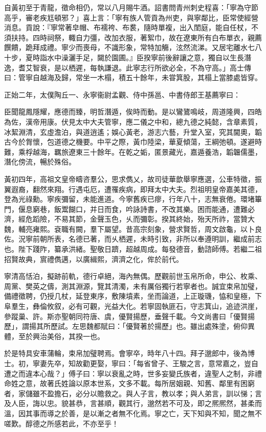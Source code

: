 \begin{pinyinscope}
自黃初至于青龍，徵命相仍，常以八月賜牛酒。詔書問青州刺史程喜：「寧為守節高乎，審老疾尪頓邪？」喜上言：「寧有族人管貢為州吏，與寧鄰比，臣常使經營消息。貢說：『寧常著皁帽、布襦袴、布裠，隨時單複，出入閨庭，能自任杖，不須扶持。四時祠祭，輙自力彊，改加衣服，著絮巾，故在遼東所有白布單衣，親薦饌饋，跪拜成禮。寧少而喪母，不識形象，常特加觴，泫然流涕。又居宅離水七八十步，夏時詣水中澡灑手足，闚於園圃。』臣揆寧前後辭讓之意，獨自以生長潛逸，耆艾智衰，是以栖遲，每執謙退。此寧志行所欲必全，不為守高。」高士傳曰：管寧自越海及歸，常坐一木榻，積五十餘年，未甞箕股，其榻上當膝處皆穿。

正始二年，太僕陶丘一、永寧衞尉孟觀、侍中孫邕、中書侍郎王基薦寧曰：

臣聞龍鳳隱耀，應德而臻，明哲潛遁，俟時而動。是以鸞鷟鳴岐，周道隆興，四皓為佐，漢帝用康。伏見太中大夫管寧，應二儀之中和，總九德之純懿，含章素質，冰絜淵清，玄虛澹泊，與道逍遙；娛心黃老，游志六藝，升堂入室，究其閫奧，韜古今於胷懷，包道德之機要。中平之際，黃巾陸梁，華夏傾蕩，王綱弛頓。遂避時難，乘桴越海，羈旅遼東三十餘年。在乾之姤，匿景藏光，嘉遁養浩，韜韞儒墨，潛化傍流，暢於殊俗。

黃初四年，高祖文皇帝疇咨羣公，思求儁乂，故司徒華歆舉寧應選，公車特徵，振翼遐裔，翻然來翔。行遇屯厄，遭罹疾病，即拜太中大夫。烈祖明皇帝嘉美其德，登為光祿勳。寧疾彌留，未能進道。今寧舊疾已瘳，行年八十，志無衰倦。環堵篳門，偃息窮巷，飯鬻餬口，并日而食，吟詠詩書，不改其樂。困而能通，遭難必濟，經危蹈險，不易其節，金聲玉色，乆而彌彰。揆其終始，殆天所祚，當贊大魏，輔亮雍熙。袞職有闕，羣下屬望。昔高宗刻象，營求賢哲，周文啟龜，以卜良佐。況寧前朝所表，名德已著，而乆栖遲，未時引致，非所以奉遵明訓，繼成前志也。陛下踐阼，纂承洪緒。聖敬日躋，超越周成。每發德音，動諮師傅。若繼二祖招賢故典，賔禮儁邁，以廣緝熙，濟濟之化，侔於前代。

寧清高恬泊，擬跡前軌，德行卓絕，海內無偶。歷觀前世玉帛所命，申公、枚乘、周黨、樊英之儔，測其淵源，覽其清濁，未有厲俗獨行若寧者也。誠宜束帛加璧，備禮徵聘，仍授几杖，延登東序，敷陳墳素，坐而論道，上正璇璣，恊和皇極，下阜羣生，彝倫攸叙，必有可觀，光益大化。若寧固執匪石，守志箕山，追迹洪崖，參蹤巢、許。斯亦聖朝同符唐、虞，優賢揚歷，垂聲千載。今文尚書曰「優賢揚歷」，謂揚其所歷試。左思魏都賦曰：「優賢著於揚歷」也。雖出處殊塗，俯仰異體，至於興治美俗，其揆一也。

於是特具安車蒲輪，束帛加璧聘焉。會寧卒，時年八十四。拜子邈郎中，後為博士。初，寧妻先卒，知故勸更娶，寧曰：「每省曾子、王駿之言，意常嘉之，豈自遭之而違本心哉？」傅子曰：寧以衰亂之時，世多妄變氏族者，違聖人之制，非禮命姓之意，故著氏姓論以原本世系，文多不載。每所居姻親、知舊、鄰里有困窮者，家儲雖不盈擔石，必分以贍救之。與人子言，教以孝；與人弟言，訓以悌；言及人臣，誨以忠。貌甚恭，言甚順，觀其行，邈然若不可及，即之熈熈然，甚柔而溫，因其事而導之於善，是以漸之者無不化焉。寧之亡，天下知與不知，聞之無不嗟歎。醇德之所感若此，不亦至乎！


\end{pinyinscope}
